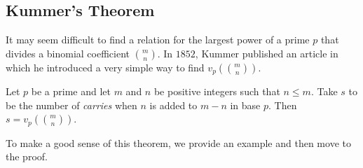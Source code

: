 \documentclass[12pt]{subfile}
\begin{document}
\subsection{Kummer's Theorem}
It may seem difficult to find a relation for the largest power of a prime $p$ that divides a binomial coefficient $\binom{m}{n}$. In $1852$, Kummer published an article in which he introduced a very simple way to find $v_p\left(\binom{m}{n}\right)$.

\begin{theorem}
	Let $p$ be a prime and let $m$ and $n$ be positive integers such that $n \leq m$. Take $s$ to be the number of \textit{carries} when $n$ is added to $m-n$ in base $p$. Then $s = v_p\left( \binom{m}{n}\right)$.
\end{theorem}

To make a good sense of this theorem, we provide an example and then move to the proof.
\end{document}
